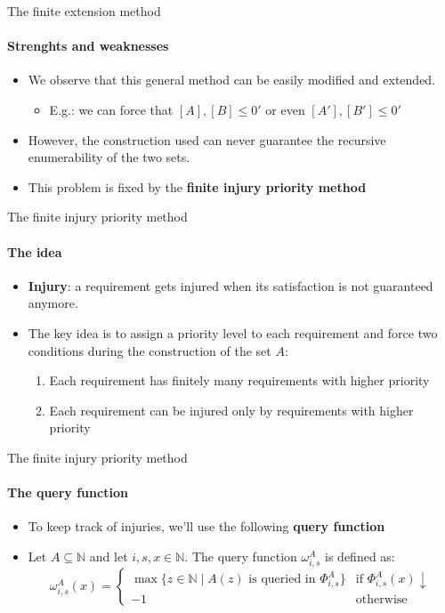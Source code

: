 \documentclass{beamer}
\newcommand{\N}{\mathbb{N}}                     %
\begin{document}
\begin{frame}{The finite extension method}
\framesubtitle{Strenghts and weaknesses}
    
    \begin{itemize}[<+->]
        \item We observe that this general method can be easily modified and extended.
        \begin{itemize}
            \item E.g.: we can force that $[A], [B] \leq 0'$ or even $[A'], [B'] \leq 0'$
        \end{itemize}
        \item However, the construction used can never guarantee the recursive enumerability of the two sets.
        \item This problem is fixed by the \textbf{finite injury priority method}
    \end{itemize}

\end{frame}

\begin{frame}{The finite injury priority method}
\framesubtitle{The idea}
    \begin{itemize}[<+->]
        \item \textbf{Injury}: a requirement gets injured when its satisfaction is not guaranteed anymore.
        
        \item The key idea is to assign a priority level to each requirement and force two conditions during the construction of the set $A$:
    \begin{enumerate}
        \item Each requirement has finitely many requirements with higher priority
        \item Each requirement can be injured only by requirements with higher priority
    \end{enumerate}
    \end{itemize}

\end{frame}

\begin{frame}{The finite injury priority method}
\framesubtitle{The query function}
    \begin{itemize}[<+->]
        \item To keep track of injuries, we'll use the following \textbf{query function}
        
        \item Let $A \subseteq \N$ and let $i,s,x \in \N$. The query function $\omega_{i,s}^A$ is defined as:
        \[\omega_{i,s}^A(x) = \left \{ \begin{array}{ll}
            \max \{z \in \N \mid A(z) \text{ is queried in } \Phi_{i,s}^A\} & \text{if } \Phi_{i,s}^A(x) \downarrow \\
            -1 & \text{otherwise}
        \end{array}\right .\]
        
    \end{itemize}

\end{frame}
\end{document}
